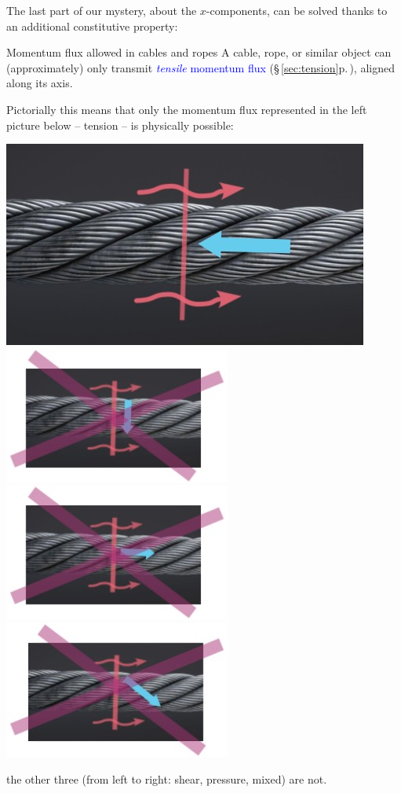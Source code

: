 \documentclass[a4paper,12pt,%
onecolumn,oneside,%
british%
]{memoir}
\renewcommand*{\|}[1][]{\nonscript\:#1\vert\nonscript\:\mathopen{}}
\newcommand*{\sect}{\S}%
\renewcommand*{\autoref}[3][\sect\,\ref]{\textcolor{blue}{#3} {\color{blue}\scriptsize(\faIcon[regular]{eye}\;#1{#2}\;p.\,\pageref{#2})}}
\begin{document}
The last part of our mystery, about the $x$-components, can be solved thanks to an additional constitutive property:
\begin{definition}{{Momentum flux allowed in cables and ropes}}
  A cable, rope, or similar object can (approximately) only transmit \autoref{sec:tension}{\emph{tensile} momentum flux}, aligned along its axis.
\end{definition}
Pictorially this means that only the momentum flux represented in the left picture below -- tension -- is physically possible:
\begin{center}
\includegraphics[align=c,width=0.33\linewidth]{images/cabletension.jpg}%
\hfill
\includegraphics[align=c,width=0.22\linewidth]{images/cableshear.jpg}%
\includegraphics[align=c,width=0.22\linewidth]{images/cablepressure.jpg}%
\includegraphics[align=c,width=0.22\linewidth]{images/cablemix.jpg}%
\end{center}
the other three (from left to right: shear, pressure, mixed) are not.
\end{document}
